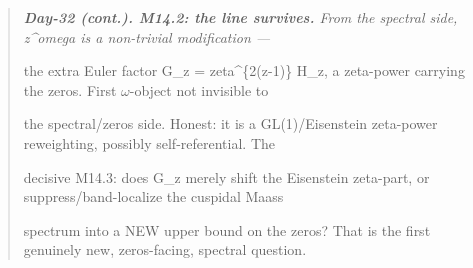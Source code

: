 \documentclass[10pt]{article}
\begin{document}
\begin{quote}\itshape
\textbf{Day-32 (cont.). M14.2: the line survives.} From the spectral side, z\textasciicircum{}omega is a non-trivial modification ---\par
the extra Euler factor G\_z = zeta\textasciicircum{}\{2(z-1)\} H\_z, a zeta-power carrying the zeros. First \ensuremath{\omega}-object not invisible to\par
the spectral/zeros side. Honest: it is a GL(1)/Eisenstein zeta-power reweighting, possibly self-referential. The\par
decisive M14.3: does G\_z merely shift the Eisenstein zeta-part, or suppress/band-localize the cuspidal Maass\par
spectrum into a NEW upper bound on the zeros? That is the first genuinely new, zeros-facing, spectral question.\par
\end{quote}
\end{document}

